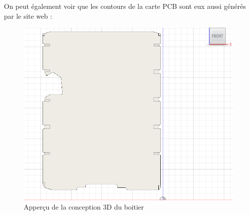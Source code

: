 On peut également voir que les contours de la carte PCB sont eux aussi générés par le site web : 

\begin{figure}[ht]
    \centering
    \includegraphics[scale=0.45]{img/pcb.PNG}
    \caption{Apperçu de la conception 3D du boitier }
    \label{fig:CameraCmdsettings}
\end{figure}

